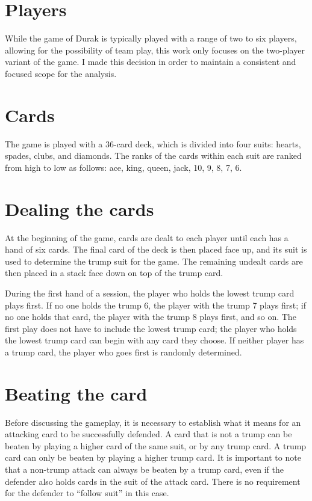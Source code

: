 \section{Players}
While the game of Durak is typically played with a range of two to six players, allowing for the possibility of team play, this work only focuses on the two-player variant of the game. I made this decision in order to maintain a consistent and focused scope for the analysis.

\section{Cards}
The game is played with a 36-card deck, which is divided into four suits: hearts, spades, clubs, and diamonds. The ranks of the cards within each suit are ranked from high to low as follows: ace, king, queen, jack, 10, 9, 8, 7, 6.

\section{Dealing the cards}
At the beginning of the game, cards are dealt to each player until each has a hand of six cards. The final card of the deck is then placed face up, and its suit is used to determine the trump suit for the game. The remaining undealt cards are then placed in a stack face down on top of the trump card.

During the first hand of a session, the player who holds the lowest trump card plays first. If no one holds the trump 6, the player with the trump 7 plays first; if no one holds that card, the player with the trump 8 plays first, and so on. The first play does not have to include the lowest trump card; the player who holds the lowest trump card can begin with any card they choose. If neither player has a trump card, the player who goes first is randomly determined.

\section{Beating the card} 
\label{BeatingRule}
Before discussing the gameplay, it is necessary to establish what it means for an attacking card to be successfully defended. A card that is not a trump can be beaten by playing a higher card of the same suit, or by any trump card. A trump card can only be beaten by playing a higher trump card. It is important to note that a non-trump attack can always be beaten by a trump card, even if the defender also holds cards in the suit of the attack card. There is no requirement for the defender to ``follow suit'' in this case.

